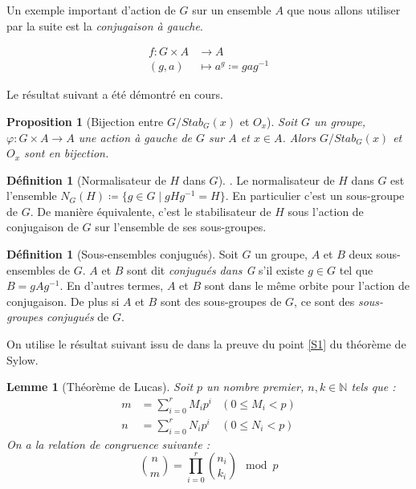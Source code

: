 \documentclass{article}
\theoremstyle{definition}
\newtheorem{definition}[subsubsection]{Définition}
\theoremstyle{plain}
\newtheorem{proposition}[subsubsection]{Proposition}
\theoremstyle{plain}
\theoremstyle{plain}
\newtheorem{lemma}[subsubsection]{Lemme}
\theoremstyle{plain}
\theoremstyle{definition}
\theoremstyle{plain}
\theoremstyle{plain}
\begin{document}
Un exemple important d'action de \( G \) sur un ensemble \( A \) que nous allons utiliser par la suite est la \textit{conjugaison à gauche}.


\begin{align*}
	f : G \times A &\to A \\
	(g,a) &\mapsto a^{g} \coloneq gag^{-1}
\end{align*}

Le résultat suivant a été démontré en cours.  
\begin{proposition}[Bijection entre \ensuremath{G/Stab_G(x)} et \ensuremath{O_x}]\label{prop:bij}
	Soit \( G \) un groupe, \( \varphi : G \times A \rightarrow A \) une action à gauche de \( G \) sur \( A \) et \( x \in A \). Alors \( G/Stab_G(x) \) et \( O_x \) sont en bijection.
\end{proposition}

\begin{definition}[Normalisateur de \ensuremath{H} dans \ensuremath{G}]\cite[p.~217]{chen2024napkin}.
	Le normalisateur de \( H \) dans \( G \) est l'ensemble 
	\( N_{G}({H}) \coloneq \{ g \in G \mid gHg^{-1} = H \} \).
	En particulier c'est un sous-groupe de \( G \). De manière équivalente, c'est le stabilisateur de \( H \) sous l'action de conjugaison de \( G \) sur l'ensemble de ses sous-groupes.
\end{definition}

\begin{definition}[Sous-ensembles conjugués]\cite[p. ~123]{dummit2003abstract} 
	Soit \( G \) un groupe, \( A \) et \( B \) deux sous-ensembles de \( G \). 
	\( A \) et \( B \) sont dit 
	\textit{conjugués dans G} s'il existe \( g \in G \) tel que \( B = gAg^{-1} \).
	En d'autres termes, \( A \) et \( B \) sont dans le même orbite pour l'action de conjugaison. De plus si \( A \) et \( B \) sont des sous-groupes de \( G \), ce sont des \textit{sous-groupes conjugués} de \( G \).
\end{definition}

On utilise le résultat suivant issu de \cite{fine1947binomial} dans la preuve du point \ref{S1} du théorème de Sylow.

\begin{lemma}[Théorème de Lucas]\label{thm:lucas}
	Soit \( p \) un nombre premier, \( n,k \in \mathbb{N} \) tels que :
	\begin{align*}
		m &= \sum_{i=0}^{r} M_{i}p^{i} &(0 \leq M_i < p)\\
		n &= \sum_{i=0}^{r} N_{i}p^{i} &(0 \leq N_i < p)
	\end{align*}
	On a la relation de congruence suivante :
	\begin{equation*}
		\binom{n}{m} = \prod_{i=0}^{r} \binom{n_i}{k_i} \mod p 
	\end{equation*}
\end{lemma}
\end{document}
